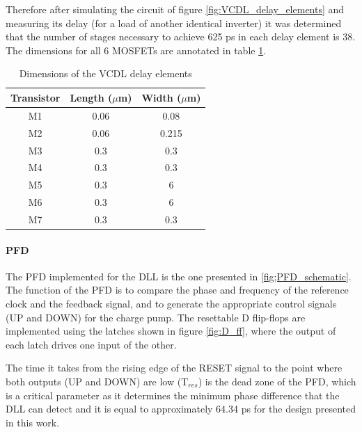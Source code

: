 Therefore after simulating the circuit of figure \ref{fig:VCDL_delay_elements} and measuring its delay (for a load of another identical inverter) it was determined that the number of stages necessary to achieve
625 ps in each delay element is 38. The dimensions for all 6 MOSFETs are annotated in table \ref{tab:VCDL_delay_elements_dimensions}.

\begin{table}[h]
    \centering
    \begin{tabular}{|c|c|c|}
        \hline
        \textbf{Transistor} & \textbf{Length ($\mu$m)} & \textbf{Width ($\mu$m)} \\
        \hline
        M1 & 0.06 & 0.08 \\
        M2 & 0.06 & 0.215 \\
        M3 & 0.3 & 0.3 \\
        M4 & 0.3 & 0.3 \\
        M5 & 0.3 & 6 \\
        M6 & 0.3 & 6 \\
        M7 & 0.3 & 0.3 \\
        \hline
    \end{tabular}
    \caption{Dimensions of the VCDL delay elements}
    \label{tab:VCDL_delay_elements_dimensions}
\end{table}

\paragraph{PFD}
The PFD implemented for the DLL is the one presented in \ref{fig;PFD_schematic}. The function of the PFD is to compare the phase and frequency of the reference clock and the feedback signal, and to generate
the appropriate control signals (UP and DOWN) for the charge pump. The resettable D flip-flops are implemented using the latches shown in figure \ref{fig:D_ff}, where the output of each latch
drives one input of the other.

The time it takes from the rising edge of the RESET signal to the point where both outputs (UP and DOWN) are low (T$_{res}$) is the dead zone of the PFD, which is a critical parameter as it determines the minimum
phase difference that the DLL can detect and it is equal to approximately 64.34 ps for the design presented in this work.


